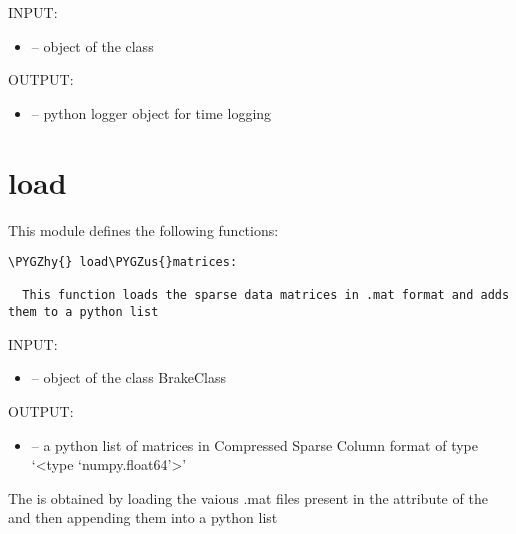 \documentclass[letterpaper,10pt,english]{sphinxmanual}
\def\PYGZus{\char`\_}
\def\PYGZhy{\char`\-}
\begin{document}

\begin{fulllineitems}
\label{index:logger.return_time_logger}
INPUT:
\begin{itemize}
\item {} 
 -- object of the class 

\end{itemize}

OUTPUT:
\begin{itemize}
\item {} 
 -- python logger object for time logging

\end{itemize}

\end{fulllineitems}



\section{load}
\label{index:load}\label{index:module-load}
This module defines the following functions:

\begin{Verbatim}[commandchars=\\\{\}]
\PYGZhy{} load\PYGZus{}matrices:

  This function loads the sparse data matrices in .mat format and adds them to a python list
\end{Verbatim}

\begin{fulllineitems}
\label{index:load.load_matrices}
INPUT:
\begin{itemize}
\item {} 
 -- object of the class BrakeClass

\end{itemize}

OUTPUT:
\begin{itemize}
\item {} 
 -- a python list of matrices in Compressed Sparse Column format 
of type `\textless{}type `numpy.float64'\textgreater{}'

\end{itemize}

The  is obtained by loading the vaious .mat files present in the
 attribute of the  and then appending them into
a python list 

\end{fulllineitems}
\end{document}

